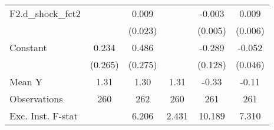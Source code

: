 {\begin{tabular}{l*{5}{c}}
\addlinespace
F2.d\_shock\_fct2     &                     &       0.009         &                     &      -0.003         &       0.009         \\
                    &                     &     (0.023)         &                     &     (0.005)         &     (0.006)         \\
\addlinespace
Constant            &       0.234         &       0.486\sym{*}  &                     &      -0.289\sym{**} &      -0.052         \\
                    &     (0.265)         &     (0.275)         &                     &     (0.128)         &     (0.046)         \\
\midrule
Mean Y              &        1.31         &        1.30         &        1.31         &       -0.33         &       -0.11         \\
Observations        &         260         &         262         &         260         &         261         &         261         \\
Exc. Inst. F-stat   &                     &       6.206         &       2.431         &      10.189         &       7.310         \\
\bottomrule
\end{tabular}
}
